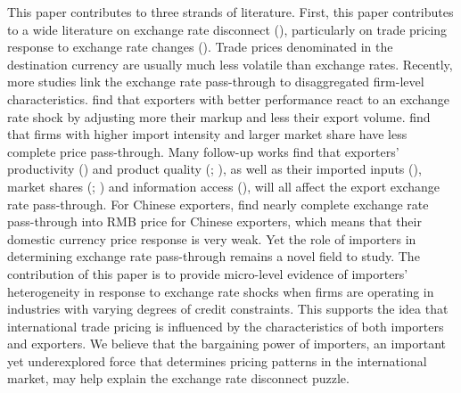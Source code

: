 \documentclass[12pt]{article}
\begin{document}
This paper contributes to three strands of literature. First, this paper contributes to a wide literature on exchange rate disconnect (\cite{obstfeld2000}), particularly on trade pricing response to exchange rate changes (\cite{campa2005}). Trade prices denominated in the destination currency are usually much less volatile than exchange rates. Recently, more studies link the exchange rate pass-through to disaggregated firm-level characteristics. \cite{bmm2012} find that exporters with better performance react to an exchange rate shock by adjusting more their markup and less their export volume. \cite{aik2014} find that firms with higher import intensity and larger market share have less complete price pass-through. Many follow-up works find that exporters' productivity (\cite{lmx2015}) and product quality (\cite{chen2016}; \cite{auer2018}), as well as their imported inputs (\cite{wang-yu2021}), market shares (\cite{auer2016}; \cite{devereux2017}) and information access (\cite{garetto2016}), will all affect the export exchange rate pass-through. For Chinese exporters, \cite{lmx2015} find nearly complete exchange rate pass-through into RMB price for Chinese exporters, which means that their domestic currency price response is very weak. Yet the role of importers in determining exchange rate pass-through remains a novel field to study. The contribution of this paper is to provide micro-level evidence of importers' heterogeneity in response to exchange rate shocks when firms are operating in industries with varying degrees of credit constraints. This supports the idea that international trade pricing is influenced by the characteristics of both importers and exporters. We believe that the bargaining power of importers, an important yet underexplored force that determines pricing patterns in the international market, may help explain the exchange rate disconnect puzzle. 
\end{document}
